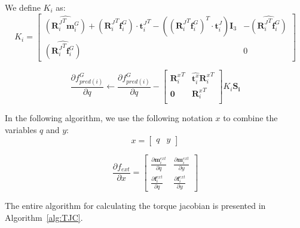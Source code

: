 We define $K_i$ as:
\begin{equation}
  K_i =
  \begin{bmatrix}
    \widehat{({\mathbf{R}_i^J}^T \mathbf{m}^{G}_i)}
    + \left({\mathbf{R}_i^J}^T \mathbf{f}^{G}_i\right) \cdot {\mathbf{t}^J_i}^T
    - \left( {({\mathbf{R}_i^J}^T \mathbf{f}^{G}_i)}^T \cdot \mathbf{t}^J_i\right) \mathbf{I}_3
    & -\widehat{({\mathbf{R}_i^J}^T \mathbf{f}^{G}_i)} \\
    \widehat{({\mathbf{R}_i^J}^T \mathbf{f}^{G}_i)} & 0
  \end{bmatrix}
\end{equation}

\begin{equation}
    \frac{\partial f^G_{pred(i)}}{\partial q} \leftarrow \frac{\partial f^G_{pred(i)}}{\partial q} -
  \begin{bmatrix}
    {\mathbf{R}^{x}_i}^T & \widehat{\mathbf{t}^{x}_i}{\mathbf{R}^{x}_i}^T \\
    \mathbf{0} & {\mathbf{R}^{x}_i}^T \\
  \end{bmatrix}
  K_i \mathbf{S_i}
\end{equation}

In the following algorithm, we use the following notation $x$ to combine the variables $q$ and $y$:
\begin{equation}
  x = \begin{bmatrix}
    q & y
  \end{bmatrix}
\end{equation}

\begin{equation}
  \frac{\partial f_{ext}}{\partial x} =
  \begin{bmatrix}
    \frac{\partial \mathbf{m}^{ext}_i}{\partial q} & \frac{\partial \mathbf{m}^{ext}_i}{\partial y}
    \\
    \frac{\partial \mathbf{f}^{ext}_i}{\partial q} & \frac{\partial \mathbf{f}^{ext}_i}{\partial y}
  \end{bmatrix}
\end{equation}


The entire algorithm for calculating the torque jacobian is presented in Algorithm~\ref{alg:TJC}.

